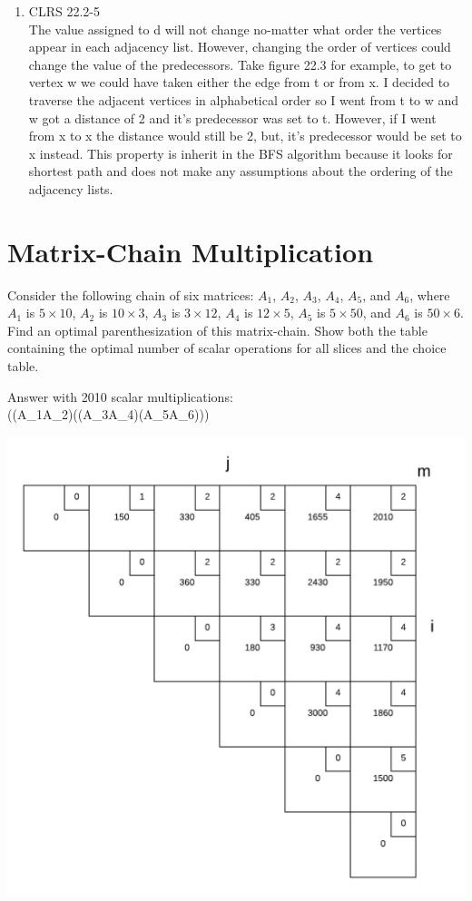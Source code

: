 \documentclass[12pt]{article}%
\begin{document}
\begin{enumerate}[label=(\alph*)]
    
    \item CLRS 22.2-5\\
    
    The value assigned to d will not change no-matter what order the vertices appear in each adjacency list. However, changing the order of vertices could change the value of the predecessors. Take figure 22.3 for example, to get to vertex w we could have taken either the edge from t or from x. I decided to traverse the adjacent vertices in alphabetical order so I went from t to w and w got a distance of 2 and it's predecessor was set to t. However, if I went from x to x the distance would still be 2, but, it's predecessor would be set to x instead. This property is inherit in the BFS algorithm because it looks for shortest path and does not make any assumptions about the ordering of the adjacency lists.
    
\end{enumerate}

\section{Matrix-Chain Multiplication}
Consider the following chain of six matrices: $A_1$, $A_2$, $A_3$,
$A_4$, $A_5$, and $A_6$, where $A_1$ is $5\times 10$, $A_2$ is
$10\times 3$, $A_3$ is $3\times 12$, $A_4$ is $12\times 5$, $A_5$ is
$5\times 50$, and $A_6$ is $50\times 6$.  Find an optimal
parenthesization of this matrix-chain.  Show both the table containing
the optimal number of scalar operations for all slices and the choice
table.

Answer with 2010 scalar multiplications:\\
((A_1A_2)((A_3A_4)(A_5A_6)))

\includegraphics[]{images/matrixMult.png}
\end{document}
